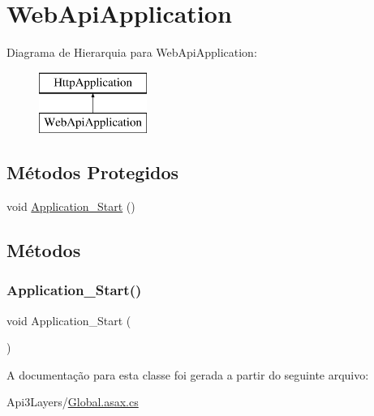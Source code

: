 \hypertarget{classApi3Layers_1_1WebApiApplication}{}\section{Web\+Api\+Application}
\label{classApi3Layers_1_1WebApiApplication}
Diagrama de Hierarquia para Web\+Api\+Application\+:\begin{figure}[H]
\begin{center}
\leavevmode
\includegraphics[height=2.000000cm]{classApi3Layers_1_1WebApiApplication}
\end{center}
\end{figure}
\subsection*{Métodos Protegidos}
\begin{DoxyCompactItemize}
\item 
void \hyperlink{classApi3Layers_1_1WebApiApplication_a71cc7d9b902e8fc085595da1960a157c}{Application\+\_\+\+Start} ()
\end{DoxyCompactItemize}


\subsection{Métodos}
\mbox{\label{classApi3Layers_1_1WebApiApplication_a71cc7d9b902e8fc085595da1960a157c}} 
\subsubsection{\texorpdfstring{Application\+\_\+\+Start()}{Application\_Start()}}
{\footnotesize\ttfamily void Application\+\_\+\+Start (\begin{DoxyParamCaption}{ }\end{DoxyParamCaption})\hspace{0.3cm}{\ttfamily [protected]}}



A documentação para esta classe foi gerada a partir do seguinte arquivo\+:\begin{DoxyCompactItemize}
\item 
Api3\+Layers/\hyperlink{Global_8asax_8cs}{Global.\+asax.\+cs}\end{DoxyCompactItemize}
